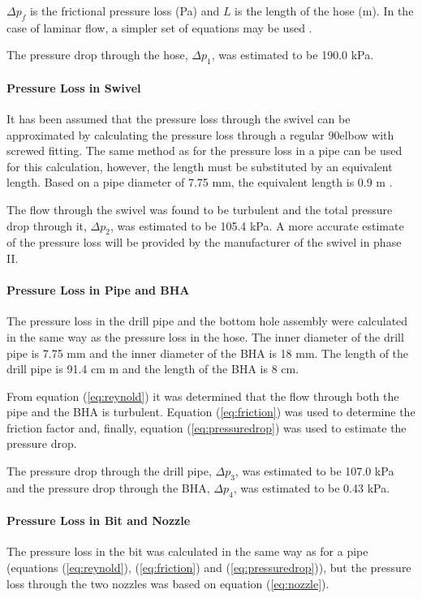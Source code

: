 $\Delta p_f$ is the frictional pressure loss (Pa) and $L$ is the length of the hose (m). In the case of laminar flow, a simpler set of equations may be used \cite{bourg}.


The pressure drop through the hose, $\Delta p_1$, was estimated to be 190.0 kPa.

\paragraph{Pressure Loss in Swivel}
It has been assumed that the pressure loss through the swivel can be approximated by calculating the pressure loss through a regular 90\degree elbow with screwed fitting. The same method as for the pressure loss in a pipe can be used for this calculation, however, the length must be substituted by an equivalent length. Based on a pipe diameter of 7.75 mm, the equivalent length is 0.9 m \cite{engtool}.

The flow through the swivel was found to be turbulent and the total pressure drop through it, $\Delta p_2$, was estimated to be 105.4 kPa. A more accurate estimate of the pressure loss will be provided by the manufacturer of the swivel in phase II. 

\paragraph{Pressure Loss in Pipe and BHA}
The pressure loss in the drill pipe and the bottom hole assembly were calculated in the same way as the pressure loss in the hose. The inner diameter of the drill pipe is 7.75 mm and the inner diameter of the BHA is 18 mm. The length of the drill pipe is 91.4 cm m and the length of the BHA is 8 cm.

From equation (\ref{eq:reynold}) it was determined that the flow through both the pipe and the BHA is turbulent. Equation (\ref{eq:friction}) was used to determine the friction factor and, finally, equation (\ref{eq:pressuredrop}) was used to estimate the pressure drop. 

The pressure drop through the drill pipe, $\Delta p_3$, was estimated to be 107.0 kPa and the pressure drop through the BHA, $\Delta p_4$, was estimated to be 0.43 kPa.


\paragraph{Pressure Loss in Bit and Nozzle}
The pressure loss in the bit was calculated in the same way as for a pipe (equations (\ref{eq:reynold}), (\ref{eq:friction}) and (\ref{eq:pressuredrop})), but the pressure loss through the two nozzles was based on equation (\ref{eq:nozzle}).

